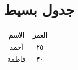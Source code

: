﻿\documentclass{article}
\begin{document}
\section{جدول بسيط}
\begin{tabular}{|c|c|}
\hline
الاسم & العمر \\
\hline
أحمد & ٢٥ \\
\hline
فاطمة & ٣٠ \\
\hline
\end{tabular}
\end{document}
